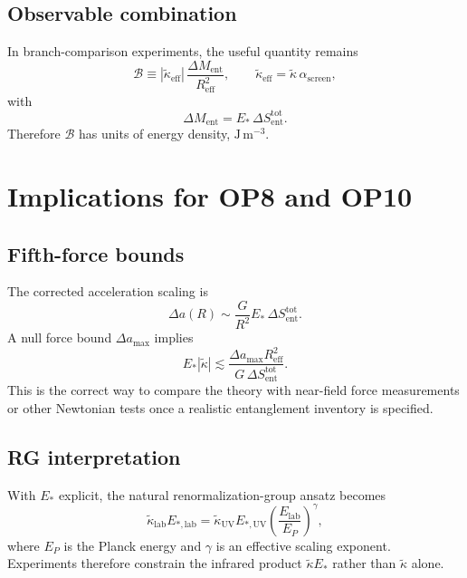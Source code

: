 \documentclass[11pt]{article}
\begin{document}
\subsection{Observable combination}

In branch-comparison experiments, the useful quantity remains
\begin{equation}
\mathcal{B} \equiv |\tilde{\kappa}_{\mathrm{eff}}|\,\frac{\Delta M_{\mathrm{ent}}}{R_{\mathrm{eff}}^2},
\qquad
\tilde{\kappa}_{\mathrm{eff}} = \tilde{\kappa}\,\alpha_{\mathrm{screen}},
\end{equation}
with
\begin{equation}
\Delta M_{\mathrm{ent}} = E_*\,\Delta S_{\mathrm{ent}}^{\mathrm{tot}}.
\end{equation}
Therefore $\mathcal{B}$ has units of energy density, $\mathrm{J\,m^{-3}}$.

\section{Implications for OP8 and OP10}

\subsection{Fifth-force bounds}

The corrected acceleration scaling is
\begin{equation}
\Delta a(R) \sim \frac{G}{R^2}E_*\,\Delta S_{\mathrm{ent}}^{\mathrm{tot}}.
\end{equation}
A null force bound $\Delta a_{\max}$ implies
\begin{equation}
E_*|\tilde{\kappa}| \lesssim \frac{\Delta a_{\max}R_{\mathrm{eff}}^2}{G\,\Delta S_{\mathrm{ent}}^{\mathrm{tot}}}.
\end{equation}
This is the correct way to compare the theory with near-field force measurements or other Newtonian tests once a realistic entanglement inventory is specified.

\subsection{RG interpretation}

With $E_*$ explicit, the natural renormalization-group ansatz becomes
\begin{equation}
\tilde{\kappa}_{\mathrm{lab}}E_{*,\mathrm{lab}} = \tilde{\kappa}_{\mathrm{UV}}E_{*,\mathrm{UV}}\left(\frac{E_{\mathrm{lab}}}{E_P}\right)^\gamma,
\end{equation}
where $E_P$ is the Planck energy and $\gamma$ is an effective scaling exponent. Experiments therefore constrain the infrared product $\tilde{\kappa}E_*$ rather than $\tilde{\kappa}$ alone.
\end{document}
